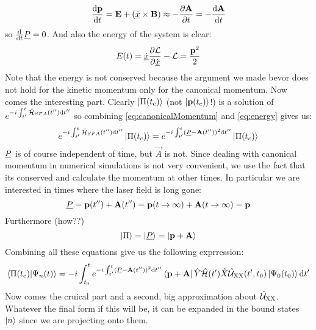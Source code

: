 \begin{equation*}
    \frac{\dd\vec{p}}{\dd t} = \vec{E} + \left(\uvec{\dot{x}}\times\vec{B}\right) \approx -\frac{\partial \vec{A}}{\partial t} = -\frac{\dd \vec{A}}{\dd t}   %
\end{equation*}
so $\frac{\mathrm{d}}{\mathrm{d} t}\underline{P}=0$.
And also the energy of the system is clear:
\begin{equation}
    E(t) = \dot{\underline{x}}\frac{\partial \mathcal{L}}{\partial \dot{\underline{x}}}-\mathcal{L} = \frac{\mathbf{p}^2}{2}     \label{eq:energy}
\end{equation}
Note that the energy is not conserved because the argument we made bevor does not hold for the kinetic momentum only for the canonical momentum.
Now comes the interesting part. Clearly $\ket{\Pi(t_{\mathrm{c}})}$ (not $\ket{\mathbf{p}(t_{\mathrm{c}})}$!) is a solution of $e^{-i \int_{t'}^{t} \hat{\mathcal{H}}_{SFA}(t'') \mathrm{d} t''}$ so combining \eqref{eq:canonicalMomentum} and \eqref{eq:energy} gives us:
\begin{equation*}
    e^{-i \int_{t'}^{t} \hat{\mathcal{H}}_{SFA}(t'') \mathrm{d} t''}\ket{\Pi(t_c)} = e^{-i \int_{t'}^{t} (\underline{P} - \mathbf{A}(t''))^2 \mathrm{d} t''}\ket{\Pi(t_c)}
\end{equation*}
$\underline{P}$ is of course independent of time, but $\vec{A}$ is not. 
Since dealing with canonical momentum in numerical simulations is not very convenient, we use the fact that its conserved and calculate the momentum at other times.
In particular we are interested in times where the laser field is long gone:
\begin{equation*}
    \underline{P} = \mathbf{p}(t'') + \mathbf{A}(t'') = \mathbf{p}(t\rightarrow \infty) + \mathbf{A}(t\rightarrow \infty) = \mathbf{p}
\end{equation*}
Furthermore (how??)
\begin{equation*}
    \ket{\Pi} = \ket{\underline{P}} = \ket{\mathbf{p}+\mathbf{A}}
\end{equation*}
Combining all these equations give us the following exprression:
\begin{equation*}
    \braket{\Pi(t_{\mathrm{c}})|\Psi_n(t)} = -i \int_{t_0}^{t} e^{-i \int_{t'}^{t} (\underline{P} - \mathbf{A}(t''))^2 \mathrm{d} t''}\bra{\mathbf{p}+\mathbf{A}}\hat{Y}\hat{\mathcal{H}}(t')\hat{X}\hat{\mathcal{U}}_{\mathrm{XX}}(t',t_0)\ket{\Psi_0(t_0)} \mathrm{d} t' \label{eq:smatrixlike}
\end{equation*}
Now comes the cruical part and a second, big approximation about $\hat{\mathcal{U}}_{\mathrm{XX}}$. 
Whatever the final form if this will be, it can be expanded in the bound states $\ket{n}$ since we are projecting onto them. 
